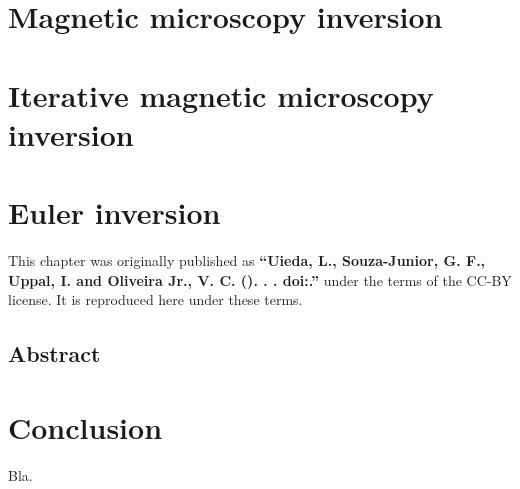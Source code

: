 \documentclass[10pt,a4paper,oneside]{book}
\begin{document}
\chapter{Magnetic microscopy inversion}

\chapter{Iterative magnetic microscopy inversion}

\chapter{Euler inversion}

\begingroup



\begin{summarybox}
    \noindent
    This chapter was originally published as
    \textbf{``Uieda, L., Souza-Junior, G. F., Uppal, I. and Oliveira Jr., V. C.
    (\Year). \Title{}. \textit{\Journal{}}.
    doi:\href{https://doi.org/\JournalDOI}{\JournalDOI}.''} under the
    terms of the CC-BY license. It is reproduced here under these terms.
\end{summarybox}

\section*{Abstract}


% 
\endgroup

\chapter{Conclusion}

Bla.




\end{document}
